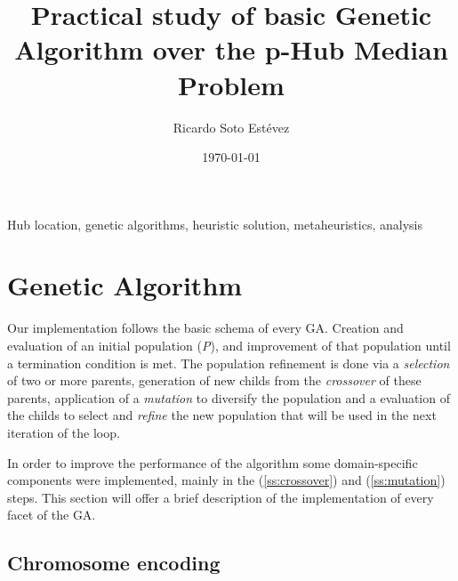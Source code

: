 \documentclass[onecolumn]{IEEEtran}
\author{Ricardo Soto Estévez}
\affil{Menendez Pelayo International University}
\date{\today}
\title{Practical study of basic Genetic Algorithm over the p-Hub Median Problem}
\begin{document}
\maketitle

\begin{abstract}  \end{abstract}

\begin{IEEEkeywords}
Hub location, genetic algorithms, heuristic solution, metaheuristics, analysis 
\end{IEEEkeywords}




\section{Genetic Algorithm}

Our implementation follows the basic schema of every GA\cite{Thede2004}. Creation and evaluation of an initial
population (\emph{P}), and improvement of that population until a termination condition is met. The population
refinement  is done via a \emph{selection} of two or more parents, generation of new childs from the
\emph{crossover} of these parents, application of a \emph{mutation} to diversify the population and a
evaluation of the childs to select and \emph{refine} the new population that will be used in the next
iteration of the loop.


In order to improve the performance of the algorithm some domain-specific components were implemented,
mainly in the  (\ref{ss:crossover}) 
and  (\ref{ss:mutation}) steps. This 
section will offer a brief description of the implementation of every facet of the GA.

\subsection{Chromosome encoding\label{ss:chromosome}}
\end{document}
